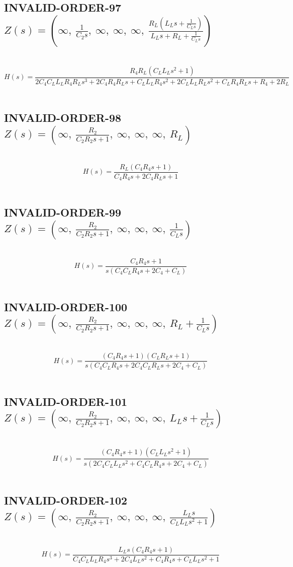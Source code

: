 \documentclass{article}
\begin{document}
\subsection{INVALID-ORDER-97 $Z(s) = \left( \infty, \  \frac{1}{C_{2} s}, \  \infty, \  \infty, \  \infty, \  \frac{R_{L} \left(L_{L} s + \frac{1}{C_{L} s}\right)}{L_{L} s + R_{L} + \frac{1}{C_{L} s}}\right)$ } \ 
\textbf{\[H(s) = \frac{R_{4} R_{L} \left(C_{L} L_{L} s^{2} + 1\right)}{2 C_{4} C_{L} L_{L} R_{4} R_{L} s^{3} + 2 C_{4} R_{4} R_{L} s + C_{L} L_{L} R_{4} s^{2} + 2 C_{L} L_{L} R_{L} s^{2} + C_{L} R_{4} R_{L} s + R_{4} + 2 R_{L}}\] } \ 
\subsection{INVALID-ORDER-98 $Z(s) = \left( \infty, \  \frac{R_{2}}{C_{2} R_{2} s + 1}, \  \infty, \  \infty, \  \infty, \  R_{L}\right)$ } \ 
\textbf{\[H(s) = \frac{R_{L} \left(C_{4} R_{4} s + 1\right)}{C_{4} R_{4} s + 2 C_{4} R_{L} s + 1}\] } \ 
\subsection{INVALID-ORDER-99 $Z(s) = \left( \infty, \  \frac{R_{2}}{C_{2} R_{2} s + 1}, \  \infty, \  \infty, \  \infty, \  \frac{1}{C_{L} s}\right)$ } \ 
\textbf{\[H(s) = \frac{C_{4} R_{4} s + 1}{s \left(C_{4} C_{L} R_{4} s + 2 C_{4} + C_{L}\right)}\] } \ 
\subsection{INVALID-ORDER-100 $Z(s) = \left( \infty, \  \frac{R_{2}}{C_{2} R_{2} s + 1}, \  \infty, \  \infty, \  \infty, \  R_{L} + \frac{1}{C_{L} s}\right)$ } \ 
\textbf{\[H(s) = \frac{\left(C_{4} R_{4} s + 1\right) \left(C_{L} R_{L} s + 1\right)}{s \left(C_{4} C_{L} R_{4} s + 2 C_{4} C_{L} R_{L} s + 2 C_{4} + C_{L}\right)}\] } \ 
\subsection{INVALID-ORDER-101 $Z(s) = \left( \infty, \  \frac{R_{2}}{C_{2} R_{2} s + 1}, \  \infty, \  \infty, \  \infty, \  L_{L} s + \frac{1}{C_{L} s}\right)$ } \ 
\textbf{\[H(s) = \frac{\left(C_{4} R_{4} s + 1\right) \left(C_{L} L_{L} s^{2} + 1\right)}{s \left(2 C_{4} C_{L} L_{L} s^{2} + C_{4} C_{L} R_{4} s + 2 C_{4} + C_{L}\right)}\] } \ 
\subsection{INVALID-ORDER-102 $Z(s) = \left( \infty, \  \frac{R_{2}}{C_{2} R_{2} s + 1}, \  \infty, \  \infty, \  \infty, \  \frac{L_{L} s}{C_{L} L_{L} s^{2} + 1}\right)$ } \ 
\textbf{\[H(s) = \frac{L_{L} s \left(C_{4} R_{4} s + 1\right)}{C_{4} C_{L} L_{L} R_{4} s^{3} + 2 C_{4} L_{L} s^{2} + C_{4} R_{4} s + C_{L} L_{L} s^{2} + 1}\] } \ 
\end{document}
